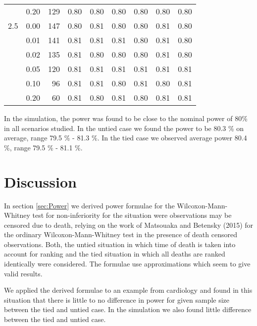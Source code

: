 \documentclass[bimj,fleqn]{w-art}\usepackage[]{graphicx}\usepackage[]{color}
\theoremstyle{plain}
\theoremstyle{definition}
\begin{document}
\begin{table}[ht]
\begin{tabular}{lrrrrrrrr}
    & 0.20 & 129 & 0.80 & 0.80 & 0.80 & 0.80 & 0.80 & 0.80 \\ 
  2.5 & 0.00 & 147 & 0.80 & 0.81 & 0.80 & 0.80 & 0.81 & 0.80 \\ 
    & 0.01 & 141 & 0.81 & 0.81 & 0.81 & 0.80 & 0.81 & 0.80 \\ 
    & 0.02 & 135 & 0.81 & 0.80 & 0.80 & 0.80 & 0.81 & 0.80 \\ 
    & 0.05 & 120 & 0.81 & 0.81 & 0.81 & 0.81 & 0.81 & 0.81 \\ 
    & 0.10 & 96 & 0.81 & 0.81 & 0.80 & 0.81 & 0.80 & 0.81 \\ 
    & 0.20 & 60 & 0.81 & 0.80 & 0.81 & 0.80 & 0.81 & 0.81 \\ 
   \hline
\end{tabular}
\end{table}


In the simulation, the power was found to be close to the nominal power of 80\%
in all scenarios studied. In the untied case we found the power to be
80.3 \% on average, range
79.5 \% - 81.3 \%.
In the tied case we observed average power
80.4 \%, range
79.5 \% - 81.1 \%.




\section{Discussion}
\label{sec:Discussion}
In section \ref{sec:Power} we derived power formulae for the Wilcoxon-Mann-Whitney
test for non-inferiority for the situation were observations may be censored due
to death, relying on the work of Matsouaka and Betensky (2015) for the ordinary
Wilcoxon-Mann-Whitney test in the presence of death censored observations. Both,
the untied situation in which time of death is taken into account for ranking and
the tied situation in which all deaths are ranked identically were considered.
The formulae use approximations which seem to give valid results.

We applied the derived formulae to an example from cardiology and found in this
situation that there is little to no difference in power for given sample size
between the tied and untied case. In the simulation we also found little
difference between the tied and untied case.
\end{document}
